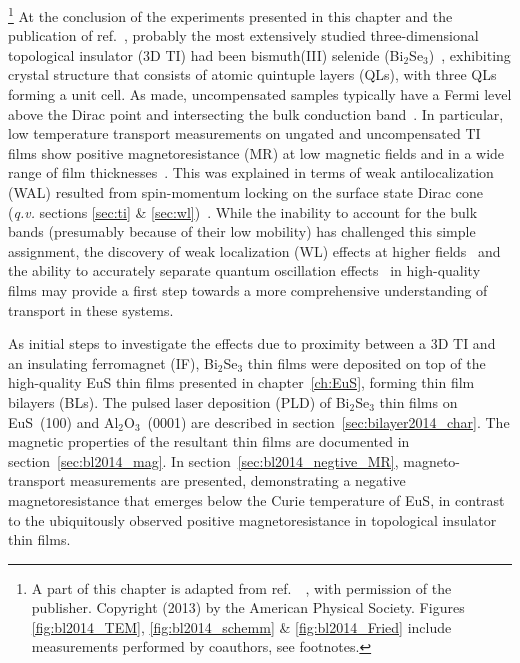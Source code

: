\footnote[2]{A part of this chapter is adapted from ref.~\cite{bilayer2014}~, with permission of the publisher. Copyright (2013) by the American Physical Society. Figures \ref{fig:bl2014_TEM}, \ref{fig:bl2014_schemm} \& \ref{fig:bl2014_Fried} include measurements performed by coauthors, see footnotes.}%
%
At the conclusion of the experiments presented in this chapter and the publication of ref.~\cite{bilayer2014}, probably the most extensively studied three-dimensional topological insulator (3D TI) had been bismuth(III) selenide (Bi$_2$Se$_3$)~\cite{TI_electronic_structure_zhang, Zhanybek3, TI_other1}, exhibiting crystal structure that consists of atomic quintuple layers (QLs), with three QLs forming a unit cell. As made, uncompensated samples typically have a Fermi level above the Dirac point and intersecting the bulk conduction band~\cite{TI_ARPES1, ARPES_thickness}. In particular, low temperature transport measurements on ungated and uncompensated TI films show positive magnetoresistance (MR) at low magnetic fields and in a wide range of film thicknesses~\cite{ TI_WAL_Hongkong, TI_WAL_thickness, zhangli2012}. This was explained in terms of weak antilocalization (WAL) resulted from spin-momentum locking on the surface state Dirac cone (\textit{q.v.} sections \ref{sec:ti} \& \ref{sec:wl})~\cite{TI_WAL_Hongkong, bergmann1984}. While the inability to account for the bulk bands (presumably because of their low mobility) has challenged this simple assignment, the discovery of weak localization (WL) effects at higher fields~\cite{zhangli2013} and the ability to accurately separate quantum oscillation effects~\cite{Ando_PRL} in high-quality films may provide a first step towards a more comprehensive understanding of transport in these systems.

As initial steps to investigate the effects due to proximity between a 3D TI and an insulating ferromagnet (IF), Bi$_2$Se$_3$ thin films were deposited on top of the high-quality EuS thin films presented in chapter~\ref{ch:EuS}, forming thin film bilayers (BLs). The pulsed laser deposition (PLD) of Bi$_2$Se$_3$ thin films on EuS~(100) and Al$_2$O$_3$~(0001) are described in section~\ref{sec:bilayer2014_char}. The magnetic properties of the resultant thin films are documented in section~\ref{sec:bl2014_mag}. In section~\ref{sec:bl2014_negtive_MR}, magneto-transport measurements are presented, demonstrating a negative magnetoresistance that emerges below the Curie temperature of EuS, in contrast to the ubiquitously observed positive magnetoresistance in topological insulator thin films.

